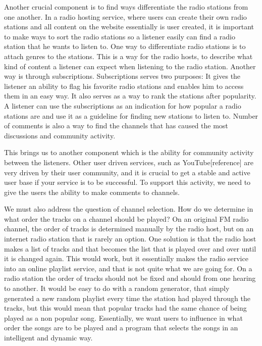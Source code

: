 \documentclass[a4paper,11pt,report]{article}
\begin{document}
Another crucial component is to find ways differentiate the radio stations from one another. In a radio hosting service, where users can create their own radio stations and all content on the website essentially is user created, it is important to make ways to sort the radio stations so a listener easily can find a radio station that he wants to listen to. One way to differentiate radio stations is to attach genres to the stations. This is a way for the radio hosts, to describe what kind of content a listener can expect when listening to the radio station. Another way is through subscriptions. Subscriptions serves two purposes: It gives the listener an ability to flag his favorite radio stations and enables him to access them in an easy way. It also serves as a way to rank the stations after popularity. A listener can use the subscriptions as an indication for how popular a radio stations are and use it as a guideline for finding new stations to listen to. Number of comments is also a way to find the channels that has caused the most discussions and community activity. 

This brings us to another component which is the ability for community activity between the listeners. Other user driven services, such as YouTube[reference] are very driven by their user community, and it is crucial to get a stable and active user base if your service is to be successful. To support this activity, we need to give the users the ability to make comments to channels.

We must also address the question of channel selection. How do we determine in what order the tracks on a channel should be played? On an original FM radio channel, the order of tracks is determined manually by the radio host, but on an internet radio station that is rarely an option. One solution is that the radio host makes a list of tracks and that becomes the list that is played over and over until it is changed again. This would work, but it essentially makes the radio service into an online playlist service, and that is not quite what we are going for. On a radio station the order of tracks should not be fixed and should from one hearing to another. It would be easy to do with a random generator, that simply generated a new random playlist every time the station had played through the tracks, but this would mean that popular tracks had the same chance of being played as a non popular song. Essentially, we want users to influence in what order the songs are to be played and a program that selects the songs in an intelligent and dynamic way. 
\end{document}
